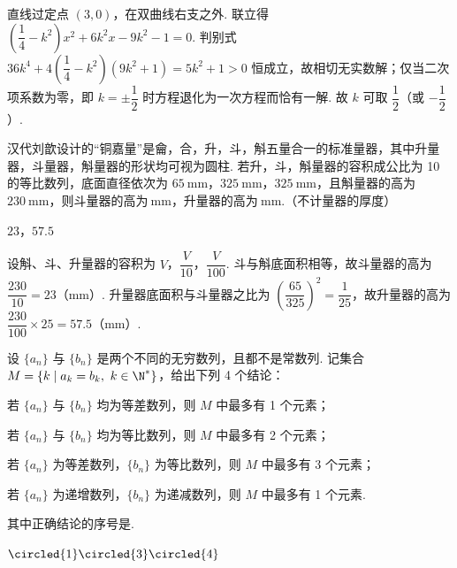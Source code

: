 \begin{solution}
直线过定点 \((3,0)\)，在双曲线右支之外. 联立得 \(\left(\dfrac14-k^2\right)x^2+6k^2x-9k^2-1=0\). 判别式 \(36k^4+4\left(\dfrac14-k^2\right)(9k^2+1)=5k^2+1>0\) 恒成立，故相切无实数解；仅当二次项系数为零，即 \(k=\pm\dfrac12\) 时方程退化为一次方程而恰有一解. 故 \(k\) 可取 \(\dfrac12\)（或 \(-\dfrac12\)）.
\end{solution}

\begin{problem}
汉代刘歆设计的“铜嘉量”是龠，合，升，斗，斛五量合一的标准量器，其中升量器，斗量器，斛量器的形状均可视为圆柱. 若升，斗，斛量器的容积成公比为 10 的等比数列，底面直径依次为 \(65\mathrm{~mm}\)，\(325\mathrm{~mm}\)，\(325\mathrm{~mm}\)，且斛量器的高为 \(230\mathrm{~mm}\)，则斗量器的高为\fillinblank{}\(\mathrm{~mm}\)，升量器的高为\fillinblank{}\(\mathrm{~mm}\).（不计量器的厚度）
\end{problem}

\begin{answer}
\(23\)，\(57.5\)
\end{answer}

\begin{solution}
设斛、斗、升量器的容积为 \(V\)，\(\dfrac{V}{10}\)，\(\dfrac{V}{100}\). 斗与斛底面积相等，故斗量器的高为 \(\dfrac{230}{10}=23\)（\(\mathrm{mm}\)）. 升量器底面积与斗量器之比为 \(\left(\dfrac{65}{325}\right)^2=\dfrac1{25}\)，故升量器的高为 \(\dfrac{230}{100}\times25=57.5\)（\(\mathrm{mm}\)）.
\end{solution}

\begin{problem}
设 \(\{a_n\}\) 与 \(\{b_n\}\) 是两个不同的无穷数列，且都不是常数列. 记集合 \(M=\{k\mid a_k=b_k,\ k\in \N^*\}\)，给出下列 4 个结论：

\begin{circlelist}
\item 若 \(\{a_n\}\) 与 \(\{b_n\}\) 均为等差数列，则 \(M\) 中最多有 1 个元素；
\item 若 \(\{a_n\}\) 与 \(\{b_n\}\) 均为等比数列，则 \(M\) 中最多有 2 个元素；
\item 若 \(\{a_n\}\) 为等差数列，\(\{b_n\}\) 为等比数列，则 \(M\) 中最多有 3 个元素；
\item 若 \(\{a_n\}\) 为递增数列，\(\{b_n\}\) 为递减数列，则 \(M\) 中最多有 1 个元素.
\end{circlelist}

其中正确结论的序号是\fillinblank{}.
\end{problem}

\begin{answer}
\(\circled{1}\circled{3}\circled{4}\)
\end{answer}

